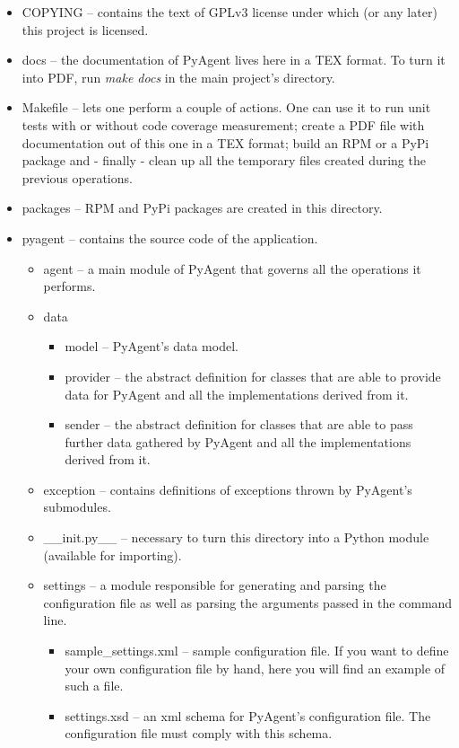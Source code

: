 \documentclass[a4paper,twoside,11pt]{article}
\begin{document}
		\begin{itemize}
			\item COPYING -- contains the text of GPLv3 license under which (or any later) this project is licensed.
			\item docs -- the documentation of PyAgent lives here in a TEX format. To turn it into PDF, run \emph{make docs} in the main project's directory.
			\item Makefile -- lets one perform a couple of actions. One can use it to run unit tests with or without code coverage measurement; create a PDF file with documentation out of this one in a TEX format; build an RPM or a PyPi package and - finally - clean up all the temporary files created during the previous operations.
			\item packages -- RPM and PyPi packages are created in this directory.
			\item pyagent -- contains the source code of the application.
				\begin{itemize}
					\item agent -- a main module of PyAgent that governs all the operations it performs.
					\item data
						\begin{itemize}
							\item model -- PyAgent's data model.
							\item provider -- the abstract definition for classes that are able to provide data for PyAgent and all the implementations derived from it.
							\item sender -- the abstract definition for classes that are able to pass further data gathered by PyAgent and all the implementations derived from it.
						\end{itemize}
					\item exception -- contains definitions of exceptions thrown by PyAgent's submodules.
					\item \_\_init.py\_\_ -- necessary to turn this directory into a Python module (available for importing).
					\item settings -- a module responsible for generating and parsing the configuration file as well as parsing the arguments passed in the command line.
						\begin{itemize}
							\item sample\_settings.xml -- sample configuration file. If you want to define your own configuration file by hand, here you will find an example of such a file.
							\item settings.xsd -- an xml schema for PyAgent's configuration file. The configuration file must comply with this schema.

\end{itemize}
\end{itemize}
\end{itemize}
\end{document}

